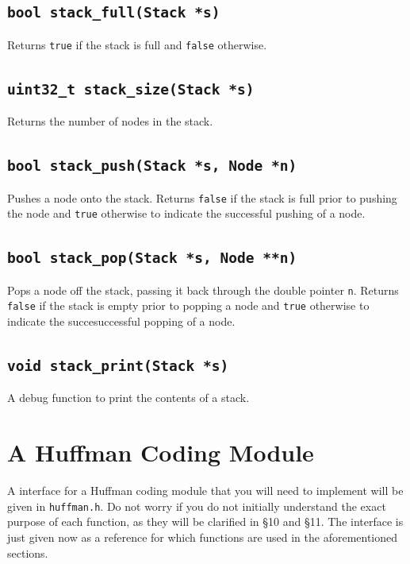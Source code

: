 \documentclass[11pt]{article}
\begin{document}
\subsection{\texttt{bool stack\_full(Stack *s)}}

Returns \texttt{true} if the stack is full and \texttt{false} otherwise.

\subsection{\texttt{uint32\_t stack\_size(Stack *s)}}

Returns the number of nodes in the stack.

\subsection{\texttt{bool stack\_push(Stack *s, Node *n)}}

Pushes a node onto the stack. Returns \texttt{false} if the stack is
full prior to pushing the node and \texttt{true} otherwise to indicate
the successful pushing of a node.

\subsection{\texttt{bool stack\_pop(Stack *s, Node **n)}}

Pops a node off the stack, passing it back through the double pointer
\texttt{n}. Returns \texttt{false} if the stack is empty prior to
popping a node and \texttt{true} otherwise to indicate the
succesuccessful popping of a node.

\subsection{\texttt{void stack\_print(Stack *s)}}

A debug function to print the contents of a stack.

\section{A Huffman Coding Module}

A interface for a Huffman coding module that you will need to
implement will be given in \texttt{huffman.h}. Do not worry if you do
not initially understand the exact purpose of each function, as they
will be clarified in \S 10 and \S 11. The interface is just given now as
a reference for which functions are used in the aforementioned sections.
\end{document}
